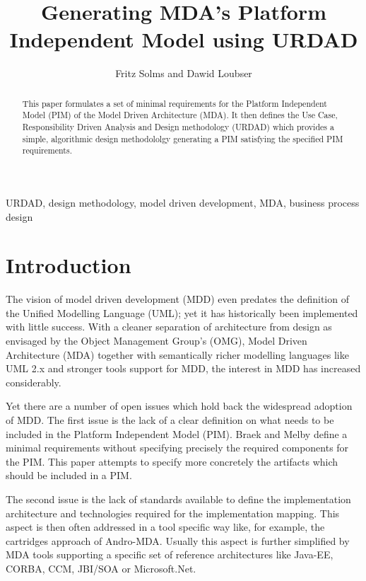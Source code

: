 \documentclass{IOS-Book-Article}
\begin{document}
\begin{frontmatter}
\title{Generating MDA's Platform Independent Model using URDAD}

\author{Fritz Solms and Dawid Loubser}
\address{Solms Training and Consulting CC, PostNet Suite 237, Private Bag X9,
Melville, 2109, Johannesburg, South Africa.}


\begin{abstract}
  This paper formulates a set of minimal requirements for the
  Platform Independent Model (PIM) of the Model Driven Architecture
  (MDA). It then defines the Use Case, Responsibility Driven Analysis and
  Design methodology (URDAD) which provides a simple, algorithmic
  design methodololgy generating a PIM satisfying the specified PIM
  requirements.
\end{abstract}

\begin{keyword}
URDAD, design methodology, model driven development, MDA, business
process design
\end{keyword}
\end{frontmatter}

\section{Introduction}

The vision of model driven development (MDD)
\cite{schmidt:modelDrivenEngineering,stahl:mdsd}
even predates the definition of the Unified Modelling Language (UML); yet it
has historically been implemented with little success. With a cleaner separation of
architecture from design as envisaged by the Object Management Group's (OMG),
Model Driven Architecture (MDA) \cite{siegel:developingInMDA,frankel:enterpriseMDA}
together with semantically richer modelling languages like UML 2.x and stronger
tools support for MDD, the interest in MDD has increased considerably.

Yet there are a number of open issues which hold back the widespread adoption of MDD.
The first issue is the lack of a clear definition on what needs to be included in the
Platform Independent Model (PIM). Braek and Melby \cite{braek:modelDrivenServiceEngineering}
define a minimal requirements without specifying precisely the required components
for the PIM. This paper attempts to specify more concretely the artifacts which should
be included in a PIM.

The second issue is the lack of standards available to define the implementation architecture
and technologies required for the implementation mapping. This aspect is then often addressed in
a tool specific way like, for example, the cartridges approach of Andro-MDA. Usually this aspect
is further simplified by MDA tools supporting a specific set of reference architectures like
Java-EE, CORBA, CCM, JBI/SOA or Microsoft.Net.
\end{document}
